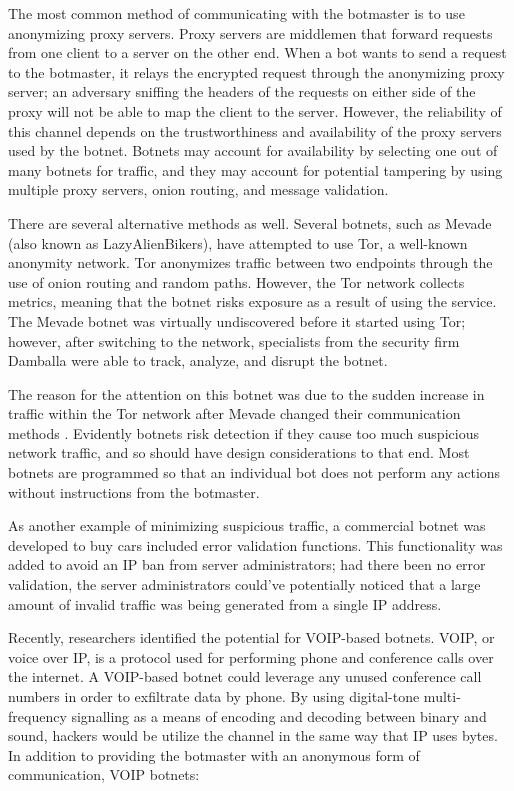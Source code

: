 \documentclass{acm_proc_article-sp}
\begin{document}
The most common method of communicating with the botmaster is to use anonymizing proxy servers.  Proxy servers are middlemen that forward requests from one client to a server on the other end.  When a bot wants to send a request to the botmaster, it relays the encrypted request through the anonymizing proxy server; an adversary sniffing the headers of the requests on either side of the proxy will not be able to map the client to the server.  However, the reliability of this channel depends on the trustworthiness and availability of the proxy servers used by the botnet.  Botnets may account for availability by selecting one out of many botnets for traffic, and they may account for potential tampering by using multiple proxy servers, onion routing, and message validation\cite{stone:p2p}\cite{defcon:prowling}.

There are several alternative methods as well. Several botnets, such as Mevade (also known as LazyAlienBikers), have attempted to use Tor, a well-known anonymity network.  Tor anonymizes traffic between two endpoints through the use of onion routing and random paths.   However, the Tor network collects metrics, meaning that the botnet risks exposure as a result of using the service. The Mevade botnet was virtually undiscovered before it started using Tor; however, after switching to the network, specialists from the security firm Damballa were able to track, analyze, and disrupt the botnet\cite{damballa:tor}. 

The reason for the attention on this botnet was due to the sudden increase in traffic within the Tor network after Mevade changed their communication methods \cite{darkreading:tor}. Evidently botnets risk detection if they cause too much suspicious network traffic, and so should have design considerations to that end. Most botnets are programmed so that an individual bot does not perform any actions without instructions from the botmaster\cite{honeynet:appendix}. 

As another example of minimizing suspicious traffic, a commercial botnet was developed to buy cars included error validation functions\cite{defcon:cars}. This functionality was added to avoid an IP ban from server administrators; had there been no error validation, the server administrators could’ve potentially noticed that a large amount of invalid traffic was being generated from a single IP address.

Recently, researchers identified the potential for VOIP-based botnets.  VOIP, or voice over IP, is a protocol used for performing phone and conference calls over the internet.  A VOIP-based botnet could leverage any unused conference call numbers in order to exfiltrate data by phone.  By using digital-tone multi-frequency signalling as a means of encoding and decoding between binary and sound, hackers would be utilize the channel in the same way that IP uses bytes.  In addition to providing the botmaster with an anonymous form of communication, VOIP botnets:
\end{document}
